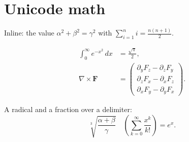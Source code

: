 \documentclass[12pt]{article}
\begin{document}
\section*{Unicode math}

Inline: the value $α^2 + β^2 = γ^2$ with $∑_{i=1}^{n} i = \frac{n(n+1)}{2}$.

\begin{align}
  ∫_0^∞ e^{-x^2}\,dx &= \frac{\sqrt{π}}{2}, \\
  \nabla × \mathbf{F} &= \begin{pmatrix} ∂_y F_z - ∂_z F_y \\
                                          ∂_z F_x - ∂_x F_z \\
                                          ∂_x F_y - ∂_y F_x \end{pmatrix}.
\end{align}

A radical and a fraction over a delimiter:
\[
  \sqrt[3]{\frac{α+β}{γ}} \quad
  \left( \sum_{k=0}^{∞} \frac{x^k}{k!} \right) = e^x .
\]
\end{document}

